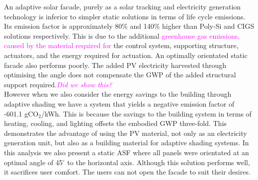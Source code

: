 
An adaptive solar facade, purely as a solar tracking and electricity generation technology is inferior to simpler static solutions in terms of life cycle emissions. Its emission factor is approximately 80\% and 140\% higher than Poly-Si and CIGS solutions respectively. This is due to the additional \textcolor{magenta}{greenhouse gas emissions, caused by the material required for} the control system, supporting structure, actuators, and the energy required for actuation. An optimally orientated static facade also performs poorly. The added PV electricity harvested through optimising the angle does not compensate the GWP of the added structural support required.\textcolor{magenta}{\textit{Did we show this?}}\\

However when we also consider the energy savings to the building through adaptive shading we have a system that yields a negative emission factor of -601.1 gCO${_2}$/kWh. This is because the savings to the building system in terms of heating, cooling, and lighting offsets the embodied GWP three-fold. This demonstrates the advantage of using the PV material, not only as an electricity generation unit, but also as a building material for adaptive shading systems. In this analysis we also present a static ASF where all panels were orientated at an optimal angle of 45$^{\circ}$ to the horizontal axis. Although this solution performs well, it sacrifices user comfort. The users can not open the facade to suit their desires.\\


